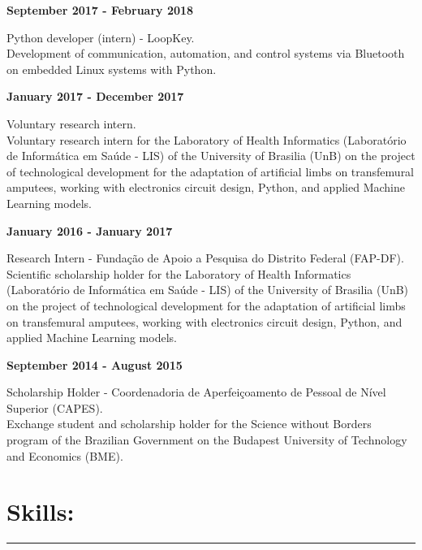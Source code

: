\documentclass[11pt]{article}
\begin{document}
\textbf{September 2017 - February 2018}
\begin{addmargin}{0.5cm}
Python developer (intern) - LoopKey.\\
Development of communication, automation, and control systems via Bluetooth on
embedded Linux systems with Python. \\
\end{addmargin}

\textbf{January 2017 - December 2017}
\begin{addmargin}{0.5cm}
Voluntary research intern.\\
Voluntary research intern for the Laboratory of Health Informatics
(Laboratório de Informática em Saúde - LIS) of the University of
Brasilia (UnB) on the project of technological development for the adaptation of artificial limbs on transfemural amputees, working with electronics circuit design, Python, and applied Machine Learning models. \\
\end{addmargin}

\textbf{January 2016 - January 2017}
\begin{addmargin}{0.5cm}
Research Intern - Fundação de Apoio a Pesquisa do Distrito Federal (FAP-DF).\\
Scientific scholarship holder for the Laboratory of Health Informatics
(Laboratório de Informática em Saúde - LIS) of the University of
Brasilia (UnB) on the project of technological development for the adaptation of artificial
limbs on transfemural amputees, working with electronics circuit design, Python, and applied
Machine Learning models. \\
\end{addmargin}

\newpage
\textbf{September 2014 - August 2015}
\begin{addmargin}{0.5cm}
Scholarship Holder - Coordenadoria de Aperfeiçoamento de Pessoal de Nível Superior (CAPES). \\
Exchange student and scholarship holder for the Science without Borders program of the Brazilian
Government on the Budapest University of Technology and Economics (BME). \\
\end{addmargin}


\section{Skills:}
\hrule \vspace{0.1cm}
\end{document}
